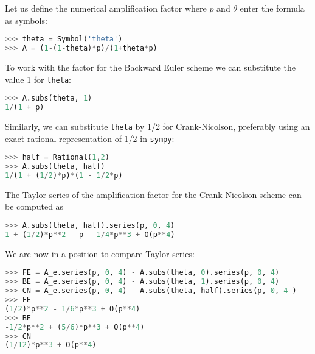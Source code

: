 \documentclass[graybox,sectrefs,envcountresetchap,open=right,final]{svmonodo}
\begin{document}
Let us define the numerical amplification factor where $p$ and $\theta$
enter the formula as symbols:




\begin{lstlisting}[language=python,style=blue1_bluegreen]
>>> theta = Symbol('theta')
>>> A = (1-(1-theta)*p)/(1+theta*p)

\end{lstlisting}

To work with the factor for the Backward Euler scheme we
can substitute the value 1 for \texttt{theta}:




\begin{lstlisting}[language=python,style=blue1_bluegreen]
>>> A.subs(theta, 1)
1/(1 + p)

\end{lstlisting}

Similarly, we can substitute \texttt{theta} by 1/2 for Crank-Nicolson,
preferably using an exact rational representation of 1/2 in \texttt{sympy}:





\begin{lstlisting}[language=python,style=blue1_bluegreen]
>>> half = Rational(1,2)
>>> A.subs(theta, half)
1/(1 + (1/2)*p)*(1 - 1/2*p)

\end{lstlisting}


The Taylor series of the amplification factor for the Crank-Nicolson
scheme can be computed as




\begin{lstlisting}[language=python,style=blue1_bluegreen]
>>> A.subs(theta, half).series(p, 0, 4)
1 + (1/2)*p**2 - p - 1/4*p**3 + O(p**4)

\end{lstlisting}

We are now in a position to compare Taylor series:











\begin{lstlisting}[language=python,style=blue1_bluegreen]
>>> FE = A_e.series(p, 0, 4) - A.subs(theta, 0).series(p, 0, 4)
>>> BE = A_e.series(p, 0, 4) - A.subs(theta, 1).series(p, 0, 4)
>>> CN = A_e.series(p, 0, 4) - A.subs(theta, half).series(p, 0, 4 )
>>> FE
(1/2)*p**2 - 1/6*p**3 + O(p**4)
>>> BE
-1/2*p**2 + (5/6)*p**3 + O(p**4)
>>> CN
(1/12)*p**3 + O(p**4)

\end{lstlisting}
\end{document}
